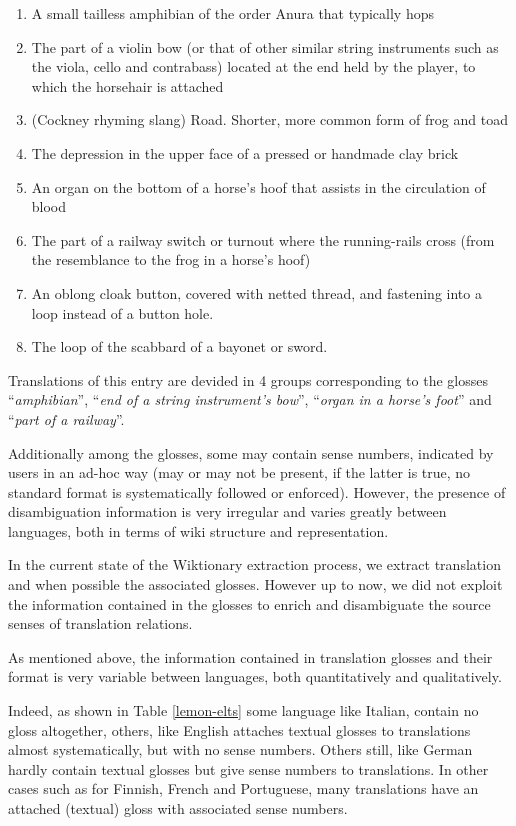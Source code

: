 \documentclass[10pt,a4paper,twoside]{article}
\begin{document}
\begin{small}\begin{enumerate}
\item A small tailless amphibian of the order Anura that typically hops
\item The part of a violin bow (or that of other similar string instruments such as the viola, cello and contrabass) located at the end held by the player, to which the horsehair is attached
\item (Cockney rhyming slang) Road. Shorter, more common form of frog and toad
\item The depression in the upper face of a pressed or handmade clay brick
\item An organ on the bottom of a horse’s hoof that assists in the circulation of blood
\item The part of a railway switch or turnout where the running-rails cross (from the resemblance to the frog in a horse’s hoof)
\item An oblong cloak button, covered with netted thread, and fastening into a loop instead of a button hole.
\item The loop of the scabbard of a bayonet or sword. 
\end{enumerate}\end{small}

Translations of this entry are devided in 4 groups corresponding to the glosses ``\emph{amphibian}'', ``\emph{end of a string instrument’s bow}'', ``\emph{organ in a horse’s foot}'' and ``\emph{part of a railway}''. 

Additionally among the glosses, some may contain sense numbers, indicated by users in an ad-hoc way (may or may not be present, if the latter is true, no standard format is systematically followed or enforced). However, the presence of disambiguation information is very irregular and varies greatly between languages, both in terms of wiki structure and representation.

In the current state of the Wiktionary extraction process, we extract translation and when possible the associated glosses. However up to now, we did not exploit the information contained in the glosses to enrich and disambiguate the source senses of translation relations.

As mentioned above, the information contained in translation glosses and their format is very variable between languages, both quantitatively and qualitatively. 

Indeed, as shown in Table \ref{lemon-elts} some language like Italian, contain no gloss altogether, others, like English attaches textual glosses to translations almost systematically, but with no sense numbers. Others still, like German hardly contain textual glosses but give sense numbers to translations. In other cases such as for Finnish, French and Portuguese, many translations have an attached (textual) gloss with associated sense numbers. 
\end{document}
